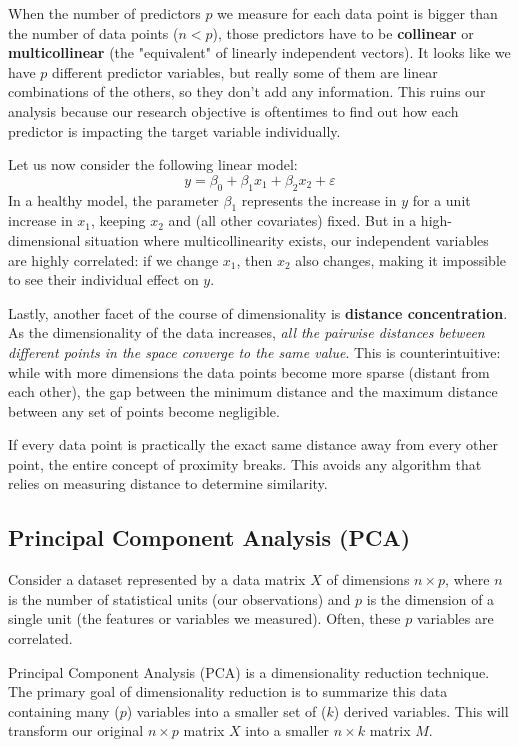 When the number of predictors $p$ we measure for each data point is bigger than the number of data points ($n < p$), those predictors have to be \textbf{collinear} or \textbf{multicollinear} (the "equivalent" of linearly independent vectors). It looks like we have $p$ different predictor variables, but really some of them are linear combinations of the others, so they don't add any information. This ruins our analysis because our research objective is oftentimes to find out how each predictor is impacting the target variable individually.

Let us now consider the following linear model:
$$
y = \beta_0 + \beta_1 x_1 + \beta_2 x_2 + \varepsilon
$$
In a healthy model, the parameter $\beta_1$ represents the increase in $y$ for a unit increase in $x_1$, keeping $x_2$ and (all other covariates) fixed. But in a high-dimensional situation where multicollinearity exists, our independent variables are highly correlated: if we change $x_1$, then $x_2$ also changes, making it impossible to see their individual effect on $y$.

Lastly, another facet of the course of dimensionality is \textbf{distance concentration}. As the dimensionality of the data increases, \textit{all the pairwise distances between different points in the space converge to the same value}. This is counterintuitive: while with more dimensions the data points become more sparse (distant from each other), the gap between the minimum distance and the maximum distance between any set of points become negligible.

If every data point is practically the exact same distance away from every other point, the entire concept of proximity breaks. This avoids any algorithm that relies on measuring distance to determine similarity.

\subsection{Principal Component Analysis (PCA)}

Consider a dataset represented by a data matrix $X$ of dimensions $n \times p$, where $n$ is the number of statistical units (our observations) and $p$ is the dimension of a single unit (the features or variables we measured). Often, these $p$ variables are correlated.

Principal Component Analysis (PCA) is a dimensionality reduction technique. The primary goal of dimensionality reduction is to summarize this data containing many ($p$) variables into a smaller set of ($k$) derived variables. This will transform our original $n \times p$ matrix $X$ into a smaller $n \times k$ matrix $M$.

